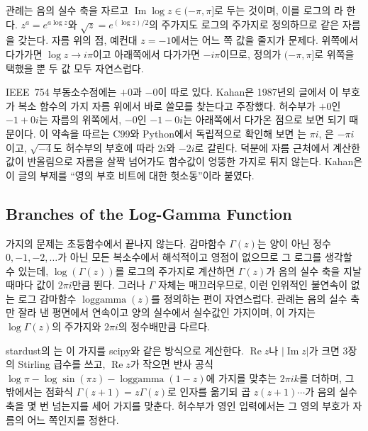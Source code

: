 관례는 음의 실수 축을 자르고 $\operatorname{Im}\log z\in(-\pi,\pi]$로 두는 것이며, 이를 로그의 라 한다. $z^a=e^{a\log z}$와 $\sqrt z=e^{(\log z)/2}$의 주가지도 로그의 주가지로 정의하므로 같은 자름을 갖는다. 자름 위의 점, 예컨대 $z=-1$에서는 어느 쪽 값을 줄지가 문제다. 위쪽에서 다가가면 $\log z\to i\pi$이고 아래쪽에서 다가가면 $-i\pi$이므로, 정의가 $(-\pi,\pi]$로 위쪽을 택했을 뿐 두 값 모두 자연스럽다.

\begin{aside}[영의 부호 비트]
IEEE~754 부동소수점에는 $+0$과 $-0$이 따로 있다. Kahan은 1987년의 글에서 이 부호가 복소 함수의 가지 자름 위에서 바로 쓸모를 찾는다고 주장했다\cite{kahan1987branch}. 허수부가 $+0$인 $-1+0i$는 자름의 위쪽에서, $-0$인 $-1-0i$는 아래쪽에서 다가온 점으로 보면 되기 때문이다. 이 약속을 따르는 C99와 Python에서 독립적으로 확인해 보면 는 $\pi i$, 은 $-\pi i$이고, $\sqrt{-4}$도 허수부의 부호에 따라 $2i$와 $-2i$로 갈린다. 덕분에 자름 근처에서 계산한 값이 반올림으로 자름을 살짝 넘어가도 함수값이 엉뚱한 가지로 튀지 않는다. Kahan은 이 글의 부제를 ``영의 부호 비트에 대한 헛소동''이라 붙였다.
\end{aside}

\subsection{Branches of the Log-Gamma Function}

가지의 문제는 초등함수에서 끝나지 않는다. 감마함수 $\Gamma(z)$는 양이 아닌 정수 $0,-1,-2,\dots$가 아닌 모든 복소수에서 해석적이고 영점이 없으므로 그 로그를 생각할 수 있는데, $\log(\Gamma(z))$를 로그의 주가지로 계산하면 $\Gamma(z)$가 음의 실수 축을 지날 때마다 값이 $2\pi i$만큼 뛴다. 그러나 $\Gamma$ 자체는 매끄러우므로, 이런 인위적인 불연속이 없는 로그 감마함수 $\operatorname{loggamma}(z)$를 정의하는 편이 자연스럽다. 관례는 음의 실수 축만 잘라 낸 평면에서 연속이고 양의 실수에서 실수값인 가지이며, 이 가지는 $\log\Gamma(z)$의 주가지와 $2\pi i$의 정수배만큼 다르다\cite{hare1997loggamma}.

\begin{instardust}
stardust의 는 이 가지를 scipy와 같은 방식으로 계산한다. $\operatorname{Re}z$나 $|\operatorname{Im}z|$가 크면 3장의 Stirling 급수를 쓰고, $\operatorname{Re}z$가 작으면 반사 공식 $\log\pi-\log\sin(\pi z)-\operatorname{loggamma}(1-z)$에 가지를 맞추는 $2\pi ik$를 더하며, 그 밖에서는 점화식 $\Gamma(z+1)=z\Gamma(z)$로 인자를 옮기되 곱 $z(z+1)\cdots$가 음의 실수 축을 몇 번 넘는지를 세어 가지를 맞춘다. 허수부가 영인 입력에서는 그 영의 부호가 자름의 어느 쪽인지를 정한다.
\end{instardust}

